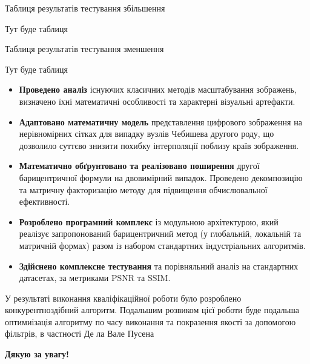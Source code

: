 \documentclass[11pt, aspectratio=169]{beamer}
\begin{document}
\begin{frame}{Таблиця результатів тестування збільшення}
	
		Тут буде таблиця
\end{frame}

\begin{frame}{Таблиця результатів тестування зменшення}
	
	Тут буде таблиця
\end{frame}

\begin{itemize}
	\item \textbf{Проведено аналіз} існуючих класичних методів масштабування зображень, визначено їхні математичні особливості та характерні візуальні артефакти.
	
	\item \textbf{Адаптовано математичну модель} представлення цифрового зображення на нерівномірних сітках для випадку вузлів Чебишева другого роду, що дозволило суттєво знизити похибку інтерполяції поблизу країв зображення.
	
	\item \textbf{Математично обґрунтовано та реалізовано поширення} другої барицентричної формули на двовимірний випадок. Проведено декомпозицію та матричну факторизацію методу для підвищення обчислювальної ефективності.
	
	\item \textbf{Розроблено програмний комплекс} із модульною архітектурою, який реалізує запропонований барицентричний метод (у глобальній, локальній та матричній формах) разом із набором стандартних індустріальних алгоритмів.
	
	\item \textbf{Здійснено комплексне тестування} та порівняльний аналіз на стандартних датасетах, за метриками PSNR та SSIM.
\end{itemize}
	
	У результаті виконання кваліфікаційної роботи було розроблено конкурентноздібний алгоритм. Подальшим розвиком цієї роботи буде подальша оптимиізація алгоритму по часу виконання та покразення якості за допомогою фільтрів, в частності Де ла Вале Пусена 
\begin{frame}
	\centering
	\Huge \textbf{Дякую за увагу!}
\end{frame}
\end{document}

